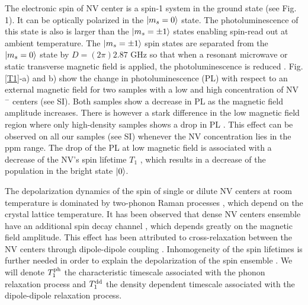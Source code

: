 \documentclass[preprintnumbers,amsmath,amssymb,superscriptaddress,twocolumn,showpacs]{revtex4-2}
\begin{document}
The electronic spin of NV center is a spin-1 system in the ground state (see Fig. 1). It can be optically polarized in the $\ket{m_s=0}$ state. The photoluminescence of this state is also is larger than the $\ket{m_s=\pm 1}$ states enabling spin-read out at ambient temperature. The $\ket{m_s=\pm 1}$ spin states are separated from the $\ket{m_s=0}$ state by  $D = (2\pi) 2.87$ GHz so that when a resonant microwave or static transverse magnetic field is applied, the photoluminescence is reduced \citep{epstein2005anisotropic,lai2009influence}. 
Fig.  \ref{T1}-a) and b) show the change in photoluminescence (PL) with respect to an external magnetic field for two samples with a low and high concentration of NV$^-$ centers (see SI). Both samples show a decrease in PL as the magnetic field amplitude increases.  There is however a stark difference in the low magnetic field region where only high-density samples shows a drop in PL \citep{jarmola_longitudinal_2015,  mrozek_longitudinal_2015}. This effect can be observed on all our samples (see SI) whenever the NV concentration lies in the ppm range. The drop of the PL at low magnetic field is associated with a decrease of the NV's spin lifetime $T_1$ \citep{jarmola_temperature-_2012}, which results in a decrease of the population in the bright state $\ket{0}$.

The depolarization dynamics of the spin of single or dilute NV centers at room temperature is dominated by two-phonon Raman processes \citep{redman1991spin,jarmola_temperature-_2012,norambuena2018spin}, which depend on the crystal lattice temperature. It has been observed that dense NV centers ensemble have an additional spin decay channel \citep{jarmola_temperature-_2012,jarmola_longitudinal_2015,mrozek_longitudinal_2015, choi2017depolarization, akhmedzhanov_microwave-free_2017, akhmedzhanov_magnetometry_2019, pellet2021magnetic, mrozek2021characterization}, which depends greatly on the magnetic field amplitude. This effect has been attributed to cross-relaxation between the NV centers through dipole-dipole coupling \citep{mrozek_longitudinal_2015, choi2017depolarization}.  Inhomogeneity of the spin lifetimes is further needed in order to explain the depolarization of the spin ensemble \citep{choi2017depolarization}. We will denote $T_1^{\rm ph}$ the characteristic timescale associated with the phonon relaxation process and $T_1^{\rm dd}$ the density dependent timescale associated with the dipole-dipole relaxation process.
\end{document}
